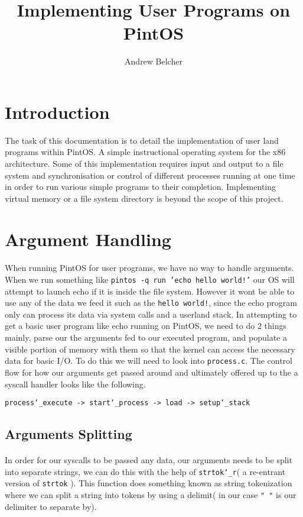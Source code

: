 \documentclass[]{article}
\title{Implementing User Programs on PintOS}
\author{Andrew Belcher}
\begin{document}
	\maketitle
	\newpage
	\tableofcontents
	\newpage
	\section{Introduction}
	The task of this documentation is to detail the implementation of user land programs within PintOS. A simple instructional operating system for the x86 architecture. Some of this implementation requires input and output to a file system and synchronisation or control of different processes running at one time in order to run various simple programs to their completion. Implementing virtual memory or a file system directory is beyond the scope of this project.
	\newpage
	\section{Argument Handling}
	\paragraph{}
	  When running PintOS for user programs, we have no way to handle arguments. When we run something like \texttt{pintos -q run 'echo hello world!'} our OS will attempt to launch echo if it is inside the file system. However it wont be able to use any of the data we feed it such as the \texttt{hello world!}, since the echo program only can process its data via system calls and a userland stack. In attempting to get a basic user program like echo running on PintOS, we need to do 2 things mainly, parse our the arguments fed to our executed program, and populate a visible portion of memory with them so that the kernel can access the necessary data for basic I/O.
	 \newline
	 \newline
	 To do this we will need to look into \texttt{process.c}. The control flow for how our arguments get passed around and ultimately offered up to the a syscall handler looks like the following.
	 \newline
	 
	 \centerline{\texttt{process\char`_execute -> start\char`_process -> load -> setup\char`_stack}} 
\newpage
  \subsection{Arguments Splitting}
  \paragraph{}
    In order for our syscalls to be passed any data, our arguments needs to be split into separate strings, we can do this with the help of \texttt{strtok\char`_r}( a re-entrant version of \texttt{strtok} ). This function does something known as string tokenization where we can split a string into tokens by using a delimit( in our case \texttt{" "} is our delimiter to separate by).
    
\end{document}
